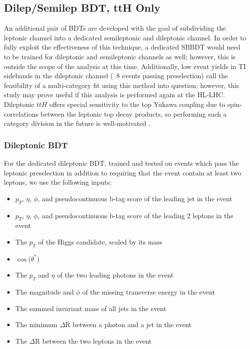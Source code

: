 \clearpage

\subsection{Dilep/Semilep BDT, ttH Only}

An additional pair of BDTs are developed with the goal of subdividing the leptonic channel into a dedicated semileptonic and dileptonic channel. In order to fully exploit the effectiveness of this technique, a dedicated SBBDT would need to be trained for dileptonic and semileptonic channels as well; however, this is outside the scope of the analysis at this time. Additionally, low event yields in TI sidebands in the dileptonic channel (~8 events passing preselection) call the feasibility of a multi-category fit using this method into question; however, this study may prove useful if this analysis is performed again at the HL-LHC. Dileptonic $ttH$ offers special sensitivity to the top Yukawa coupling due to spin-correlations between the leptonic top decay products, so performing such a category division in the future is well-motivated \cite{Ellis}. 

\subsubsection{Dileptonic BDT}
For the dedicated dileptonic BDT, trained and tested on events which pass the leptonic preselection in addition to requiring that the event contain at least two leptons, we use the following inputs:

\begin{itemize}
\item $p_{T}$, $\eta$, $\phi$, and pseudocontinuous b-tag score of the leading jet in the event
\item $p_{T}$, $\eta$, $\phi$, and pseudocontinuous b-tag score of the leading 2 leptons in the event
\item The $p_{T}$ of the Higgs candidate, scaled by its mass
\item  $\cos$($\theta^{*}$)
\item The $p_{T}$ and $\eta$ of the two leading photons in the event
\item The magnitude and $\phi$ of the missing transverse energy in the event
\item The summed invariant mass of all jets in the event
\item The minimum $\Delta$R between a photon and a jet in the event
\item The $\Delta$R between the two leptons in the event
\end{itemize} 

